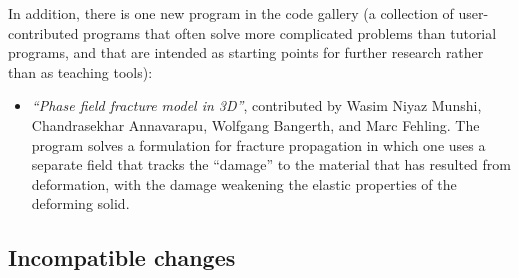 \documentclass{ansarticle-preprint}
\begin{document}
In addition, there is one new program in the code gallery (a collection of
user-contributed programs that often solve more complicated problems
than tutorial programs, and that are intended as starting points for further
research rather than as teaching tools):
\begin{itemize}
  \item \emph{``Phase field fracture model in 3D''},
    contributed by Wasim Niyaz Munshi,
    Chandrasekhar Annavarapu,
    Wolfgang Bangerth, and
    Marc Fehling. The program solves a formulation for fracture
    propagation in which one uses a separate field that tracks the
    ``damage'' to the material that has resulted from deformation,
    with the damage weakening the elastic properties of the deforming solid.
\end{itemize}


\subsection{Incompatible changes}\label{subsec:deprecated}
\end{document}
